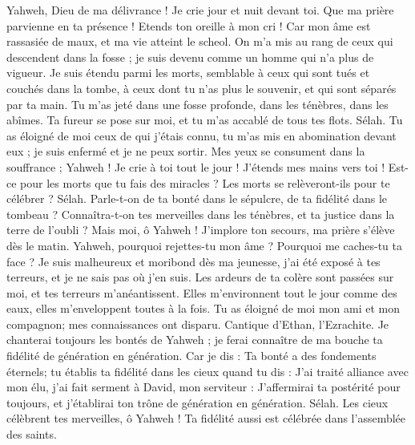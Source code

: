 \begin{multicols}{2}
Yahweh, Dieu de ma délivrance ! Je crie jour et nuit devant toi.
Que ma prière parvienne en ta présence ! Etends ton oreille à mon cri !
Car mon âme est rassasiée de maux, et ma vie atteint le scheol.
On m'a mis au rang de ceux qui descendent dans la fosse ; je suis devenu comme un homme qui n'a plus de vigueur.
Je suis étendu parmi les morts, semblable à ceux qui sont tués et couchés dans la tombe, à ceux dont tu n'as plus le souvenir, et qui sont séparés par ta main.
Tu m'as jeté dans une fosse profonde, dans les ténèbres, dans les abîmes.
Ta fureur se pose sur moi, et tu m'as accablé de tous tes flots. Sélah.
Tu as éloigné de moi ceux de qui j'étais connu, tu m'as mis en abomination devant eux ; je suis enfermé et je ne peux sortir.
Mes yeux se consument dans la souffrance ; Yahweh ! Je crie à toi tout le jour ! J'étends mes mains vers toi !
Est-ce pour les morts que tu fais des miracles ? Les morts se relèveront-ils pour te célébrer ? Sélah.
Parle-t-on de ta bonté dans le sépulcre, de ta fidélité dans le tombeau ?
Connaîtra-t-on tes merveilles dans les ténèbres, et ta justice dans la terre de l'oubli ?
Mais moi, ô Yahweh ! J'implore ton secours, ma prière s'élève dès le matin.
Yahweh, pourquoi rejettes-tu mon âme ? Pourquoi me caches-tu ta face ?
Je suis malheureux et moribond dès ma jeunesse, j'ai été exposé à tes terreurs, et je ne sais pas où j'en suis.
Les ardeurs de ta colère sont passées sur moi, et tes terreurs m'anéantissent.
Elles m'environnent tout le jour comme des eaux, elles m'enveloppent toutes à la fois.
Tu as éloigné de moi mon ami et mon compagnon; mes connaissances ont disparu.
\VerseOne{}Cantique d'Ethan, l'Ezrachite.
Je chanterai toujours les bontés de Yahweh ; je ferai connaître de ma bouche ta fidélité de génération en génération.
Car je dis : Ta bonté a des fondements éternels; tu établis ta fidélité dans les cieux quand tu dis :
J'ai traité alliance avec mon élu, j'ai fait serment à David, mon serviteur :
J'affermirai ta postérité pour toujours, et j'établirai ton trône de génération en génération. Sélah.
Les cieux célèbrent tes merveilles, ô Yahweh ! Ta fidélité aussi est célébrée dans l'assemblée des saints.

\end{multicols}
